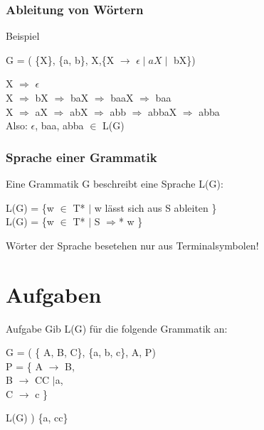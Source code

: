\documentclass{beamer}
\begin{document}
\begin{frame}
	\frametitle{Ableitung von W\"ortern}
	\begin{example}{Beispiel}
		\begin{center}
			G = ( \{X\}, \{a, b\}, X,\{X $\rightarrow$ $\epsilon \mid aX \mid$ bX\})
		\end{center}

		X $\Rightarrow$ $\epsilon$ \\
		X $\Rightarrow$ bX $\Rightarrow$ baX $\Rightarrow$ baaX $\Rightarrow$ baa \\
		X $\Rightarrow$ aX $\Rightarrow$ abX $\Rightarrow$ abb $\Rightarrow$ abbaX $\Rightarrow$ abba  \\

		Also: $\epsilon$, baa, abba $\in$ L(G)

	\end{example}
\end{frame}

\begin{frame}
	\frametitle{Sprache einer Grammatik}
	Eine Grammatik G beschreibt eine Sprache L(G):
	\begin{center}
		L(G) = \{w $\in$ T* $\mid$ w l\"asst sich aus S ableiten  \} \\
		L(G) = \{w $\in$ T* $\mid$ S $\Rightarrow$* w \}
	\end{center}
	W\"orter der Sprache besetehen nur aus Terminalsymbolen!
\end{frame}

\section{Aufgaben}
\begin{frame}
	\begin{block}{Aufgabe}
	Gib L(G) f\"ur die folgende Grammatik an:
	\begin{center}
		G = ( \{ A, B, C\}, \{a, b, c\}, A, P) \\
		P = \{ A $\rightarrow$ B, \\
			B $\rightarrow$ CC $\mid$a, \\
			C $\rightarrow$ c
			\}
	\end{center}
	\pause
	\begin{example}
	L(G) ) \{a, cc\}
	\end{example}
	\end{block}
\end{frame}
\end{document}
